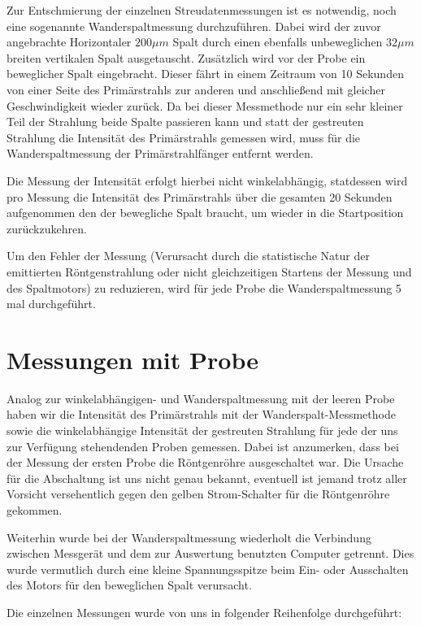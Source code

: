 \documentclass[bigchapter,colorback,accentcolor=tud4b,linedtoc,11pt]{tudreport}
\begin{document}
Zur Entschmierung der einzelnen Streudatenmessungen ist es notwendig, noch eine sogenannte Wanderspaltmessung durchzuführen. Dabei wird der zuvor angebrachte Horizontaler $200\mu m$ Spalt durch einen ebenfalls unbeweglichen $32 \mu m$ breiten vertikalen Spalt ausgetauscht. Zusätzlich wird vor der Probe ein beweglicher Spalt eingebracht. Dieser fährt in einem Zeitraum von 10 Sekunden von einer Seite des Primärstrahls zur anderen und anschließend mit gleicher Geschwindigkeit wieder zurück. Da bei dieser Messmethode nur ein sehr kleiner Teil der Strahlung beide Spalte passieren kann und statt der gestreuten Strahlung die Intensität des Primärstrahls gemessen wird, muss für die Wanderspaltmessung der Primärstrahlfänger entfernt werden.

Die Messung der Intensität erfolgt hierbei nicht winkelabhängig, statdessen wird pro Messung die Intensität des Primärstrahls über die gesamten 20 Sekunden aufgenommen den der bewegliche Spalt braucht, um wieder in die Startposition zurückzukehren.

Um den Fehler der Messung (Verursacht durch die statistische Natur der emittierten Röntgenstrahlung oder nicht gleichzeitigen Startens der Messung und des Spaltmotors) zu reduzieren, wird für jede Probe die Wanderspaltmessung 5 mal durchgeführt.

\clearpage{}
\section{Messungen mit Probe}

Analog zur winkelabhängigen- und Wanderspaltmessung mit der leeren Probe haben wir die Intensität des Primärstrahls mit der Wanderspalt-Messmethode sowie die winkelabhängige Intensität der gestreuten Strahlung für jede der uns zur Verfügung stehendenden Proben gemessen. Dabei ist anzumerken, dass bei der Messung der ersten Probe die Röntgenröhre ausgeschaltet war. Die Ursache für die Abschaltung ist uns nicht genau bekannt, eventuell ist jemand trotz aller Vorsicht versehentlich gegen den gelben Strom-Schalter für die Röntgenröhre gekommen.

Weiterhin wurde bei der Wanderspaltmessung wiederholt die Verbindung zwischen Messgerät und dem zur Auswertung benutzten Computer getrennt. Dies wurde vermutlich durch eine kleine Spannungsspitze beim Ein- oder Ausschalten des Motors für den beweglichen Spalt verursacht.

Die einzelnen Messungen wurde von uns in folgender Reihenfolge durchgeführt:
\end{document}
